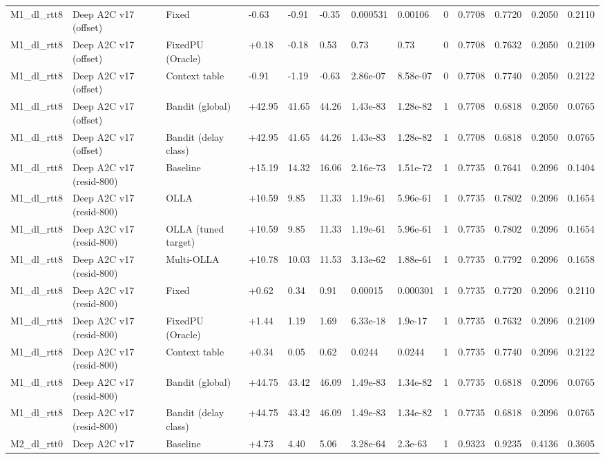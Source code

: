 \documentclass[10pt]{article}
\begin{document}
\begin{landscape}
\begin{longtable}{@{}lllllllllllll@{}}
M1\_dl\_rtt8 & Deep A2C v17 (offset) & Fixed & -0.63 & -0.91 & -0.35 & 0.000531 & 0.00106 & 0 & 0.7708 & 0.7720 & 0.2050 & 0.2110 \\
M1\_dl\_rtt8 & Deep A2C v17 (offset) & FixedPU (Oracle) & +0.18 & -0.18 & 0.53 & 0.73 & 0.73 & 0 & 0.7708 & 0.7632 & 0.2050 & 0.2109 \\
M1\_dl\_rtt8 & Deep A2C v17 (offset) & Context table & -0.91 & -1.19 & -0.63 & 2.86e-07 & 8.58e-07 & 0 & 0.7708 & 0.7740 & 0.2050 & 0.2122 \\
M1\_dl\_rtt8 & Deep A2C v17 (offset) & Bandit (global) & +42.95 & 41.65 & 44.26 & 1.43e-83 & 1.28e-82 & 1 & 0.7708 & 0.6818 & 0.2050 & 0.0765 \\
M1\_dl\_rtt8 & Deep A2C v17 (offset) & Bandit (delay class) & +42.95 & 41.65 & 44.26 & 1.43e-83 & 1.28e-82 & 1 & 0.7708 & 0.6818 & 0.2050 & 0.0765 \\
M1\_dl\_rtt8 & Deep A2C v17 (resid-800) & Baseline & +15.19 & 14.32 & 16.06 & 2.16e-73 & 1.51e-72 & 1 & 0.7735 & 0.7641 & 0.2096 & 0.1404 \\
M1\_dl\_rtt8 & Deep A2C v17 (resid-800) & OLLA & +10.59 & 9.85 & 11.33 & 1.19e-61 & 5.96e-61 & 1 & 0.7735 & 0.7802 & 0.2096 & 0.1654 \\
M1\_dl\_rtt8 & Deep A2C v17 (resid-800) & OLLA (tuned target) & +10.59 & 9.85 & 11.33 & 1.19e-61 & 5.96e-61 & 1 & 0.7735 & 0.7802 & 0.2096 & 0.1654 \\
M1\_dl\_rtt8 & Deep A2C v17 (resid-800) & Multi-OLLA & +10.78 & 10.03 & 11.53 & 3.13e-62 & 1.88e-61 & 1 & 0.7735 & 0.7792 & 0.2096 & 0.1658 \\
M1\_dl\_rtt8 & Deep A2C v17 (resid-800) & Fixed & +0.62 & 0.34 & 0.91 & 0.00015 & 0.000301 & 1 & 0.7735 & 0.7720 & 0.2096 & 0.2110 \\
M1\_dl\_rtt8 & Deep A2C v17 (resid-800) & FixedPU (Oracle) & +1.44 & 1.19 & 1.69 & 6.33e-18 & 1.9e-17 & 1 & 0.7735 & 0.7632 & 0.2096 & 0.2109 \\
M1\_dl\_rtt8 & Deep A2C v17 (resid-800) & Context table & +0.34 & 0.05 & 0.62 & 0.0244 & 0.0244 & 1 & 0.7735 & 0.7740 & 0.2096 & 0.2122 \\
M1\_dl\_rtt8 & Deep A2C v17 (resid-800) & Bandit (global) & +44.75 & 43.42 & 46.09 & 1.49e-83 & 1.34e-82 & 1 & 0.7735 & 0.6818 & 0.2096 & 0.0765 \\
M1\_dl\_rtt8 & Deep A2C v17 (resid-800) & Bandit (delay class) & +44.75 & 43.42 & 46.09 & 1.49e-83 & 1.34e-82 & 1 & 0.7735 & 0.6818 & 0.2096 & 0.0765 \\
M2\_dl\_rtt0 & Deep A2C v17 & Baseline & +4.73 & 4.40 & 5.06 & 3.28e-64 & 2.3e-63 & 1 & 0.9323 & 0.9235 & 0.4136 & 0.3605 \\

\end{longtable}
\end{landscape}
\end{document}
